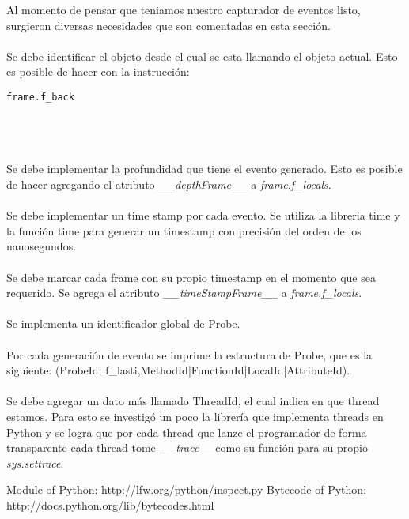 \documentclass[10pt,a4paper]{article}
\begin{document}
Al momento de pensar que teniamos nuestro capturador de eventos listo, surgieron diversas necesidades que son comentadas en esta sección.\\
\\
Se debe identificar el objeto desde el cual se esta llamando el objeto actual.  Esto es posible de hacer con la instrucción:

\begin{verbatim}
frame.f_back
\end{verbatim}
\\
\\
\\
Se debe implementar la profundidad que tiene el evento generado.  Esto es posible de hacer agregando el atributo \textit{\_\_depthFrame\_\_} a \textit{frame.f\_locals}.\\
\\
Se debe implementar un time stamp por cada evento.  Se utiliza la libreria time y la función time para generar un timestamp con precisión del orden de los nanosegundos.\\
\\
Se debe marcar cada frame con su propio timestamp en el momento que sea requerido.  Se agrega el atributo \textit{\_\_timeStampFrame\_\_} a \textit{frame.f\_locals}.\\
\\
Se implementa un identificador global de Probe.\\
\\
Por cada generación de evento se imprime la estructura de Probe, que es la siguiente: (ProbeId, f\_lasti,MethodId|FunctionId|LocalId|AttributeId).\\
\\
Se debe agregar un dato más llamado ThreadId, el cual indica en que thread estamos.  Para esto se investigó un poco la librería que implementa threads en Python y se logra que por cada thread que lanze el programador de forma transparente cada thread tome \textit{\_\_trace\_\_}como su función para su propio \textit{sys.settrace}.\\



\pagebreak

\begin{thebibliography}{2}
 Module of Python: http://lfw.org/python/inspect.py
 Bytecode of Python: http://docs.python.org/lib/bytecodes.html
\end{thebibliography}
\end{document}
